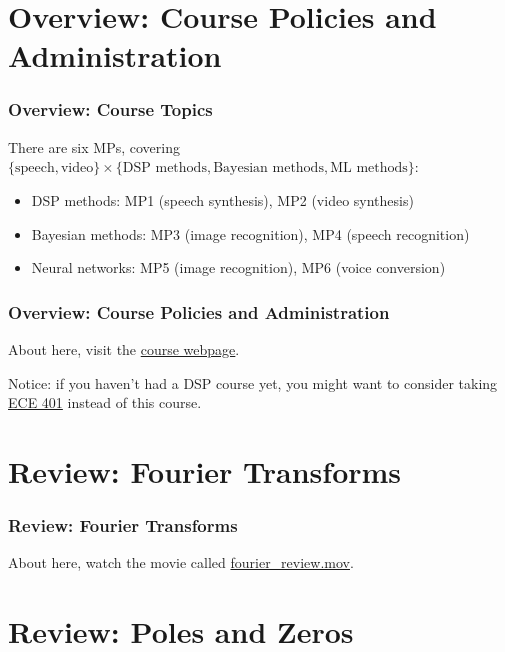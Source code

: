 \documentclass{beamer}
\begin{document}
\section[Overview]{Overview: Course Policies and Administration}
\setcounter{subsection}{1}

\begin{frame}
  \frametitle{Overview: Course Topics}

  There are six MPs, covering
  $\{\mbox{speech},\mbox{video}\}\times\{\mbox{DSP
    methods},\mbox{Bayesian methods},\mbox{ML methods}\}$:
  \begin{itemize}
  \item DSP methods: MP1 (speech synthesis), MP2 (video synthesis)
  \item Bayesian methods: MP3 (image recognition), MP4 (speech recognition)
  \item Neural networks: MP5 (image recognition), MP6 (voice conversion)
  \end{itemize}
\end{frame}

\begin{frame}
  \frametitle{Overview: Course  Policies and Administration}

  About here, visit the 
  \href{https://courses.grainger.illinois.edu/ece417/fa2021/}{course webpage}.

  Notice: if you haven't had a DSP course yet, you might want to
  consider taking
  \href{https://courses.grainger.illinois.edu/ece401/fa2021/}{ECE 401}
  instead of this course.
\end{frame}

\section[Fourier]{Review: Fourier Transforms}
\setcounter{subsection}{1}

\begin{frame}
  \frametitle{Review: Fourier Transforms}

  About here, watch the movie called
  \href{https://mediaspace.illinois.edu/media/t/1_x7tsa6l7/26816181}{fourier\_review.mov}.
\end{frame}

\section[Poles/Zeros]{Review: Poles and Zeros}
\setcounter{subsection}{1}
\end{document}
